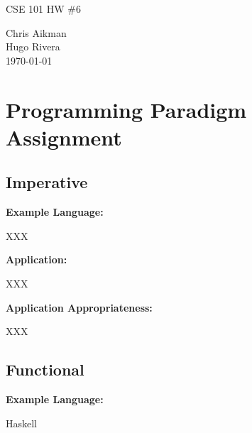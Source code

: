 \documentclass[hidelinks,12pt]{article}
\begin{document}
\begin{titlepage}
\begin{center}
\Huge {CSE 101 HW \#6}\\
[1cm]
\normalsize

Chris Aikman\\
Hugo Rivera\\
[1cm]

{\today}

\end{center}
\end{titlepage}

\newpage

\section{Programming Paradigm Assignment}
\subsection{Imperative}
\begin{addmargin}[1cm]{0em}%
\textbf{Example Language:}
	\begin{addmargin}[1cm]{0em}%
		XXX
	\end{addmargin}
\end{addmargin}

\begin{addmargin}[1cm]{0em}%
\textbf{Application:}
	\begin{addmargin}[1cm]{0em}%
		XXX
	\end{addmargin}
\end{addmargin}

\begin{addmargin}[1cm]{0em}%
\textbf{Application Appropriateness:}
	\begin{addmargin}[1cm]{0em}%
		XXX
	\end{addmargin}
\end{addmargin}

\subsection{Functional}
\begin{addmargin}[1cm]{0em}%
\textbf{Example Language:}
	\begin{addmargin}[1cm]{0em}%
		Haskell
	\end{addmargin}
\end{addmargin}
\end{document}
